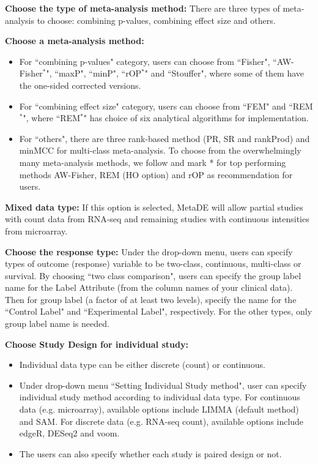 \begin{steps}
\item \textbf{Choose the type of meta-analysis method:}
There are three types of meta-analysis to choose:
combining p-values, combining effect size and others.

\item \textbf{Choose a meta-analysis method:}
\begin{itemize}
\item For ``combining p-values" category,
users can choose from ``Fisher", ``AW-Fisher$^{\ast}$", ``maxP", ``minP", ``rOP$^{\ast}$" and ``Stouffer",
where some of them have the one-sided corrected versions. 

\item For ``combining effect size" category,
users can choose from ``FEM" and ``REM$^{\ast}$",
where ``REM$^{\ast}$" has choice of six analytical algorithms for implementation.

\item For ``others",
there are three rank-based method (PR, SR and rankProd) and minMCC for multi-class meta-analysis.
To choose from the overwhelmingly many meta-analysis methods,
we follow \cite{chang2013meta} and mark * for top performing methods AW-Fisher, REM (HO option) and rOP as recommendation for users.
\end{itemize}

\item \textbf{Mixed data type:}
If this option is selected,
MetaDE will allow partial studies with count data from RNA-seq and remaining studies with continuous intensities from microarray.

\item \textbf{Choose the response type:}
Under the drop-down menu,
users can specify types of outcome (response) variable to be two-class, continuous, multi-class or survival.
By choosing ``two class comparison",
users can specify the group label name for the Label Attribute (from the column names of your clinical data).
Then for group label (a factor of at least two levels),
specify the name for the ``Control Label" and ``Experimental Label", respectively.
For the other types, only group label name is needed.

\item \textbf{Choose Study Design for individual study:}
\begin{itemize}
\item Individual data type can be either discrete (count) or continuous.
\item Under drop-down menu ``Setting Individual Study method", user can specify  individual study method according to individual data type.
For continuous data (e.g. microarray), available options include LIMMA (default method) and SAM.
For discrete data (e.g. RNA-seq count), available options include edgeR, DESeq2 and voom.
\item The users can also specify whether each study is paired design or not.
\end{itemize}


\end{steps}
